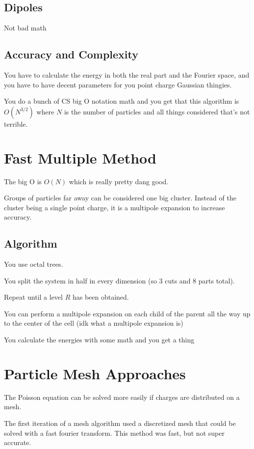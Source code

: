 \documentclass[fleqn]{report}
\begin{document}
\subsection{Dipoles}
Not bad math

\subsection{Accuracy and Complexity}
You have to calculate the energy in both the real part and the Fourier space, and 
you have to have decent parameters for you point charge Gaussian thingies. 

You do a bunch of CS big O notation math and you get that this algorithm 
is $O(N^{3/2})$ where $N$ is the number of particles and all things considered 
that's not terrible.

\section{Fast Multiple Method}
The big O is $O(N)$ which is really pretty dang good. 

Groups of particles far away can be considered one big cluster.
Instead of the cluster being a single point charge, it is a multipole expansion 
to increase accuracy.

\subsection{Algorithm}
You use octal trees. 

You split the system in half in every dimension (so 3 cuts and 8 parts total).

Repeat until a level $R$ has been obtained. 

You can perform a multipole expansion on each child of the parent all the way 
up to the center of the cell (idk what a multipole expansion is)

You calculate the energies with some math and you get a thing 

\section{Particle Mesh Approaches}
The Poisson equation can be solved more easily if charges are distributed on 
a mesh. 

The first iteration of a mesh algorithm used a discretized mesh that could 
be solved with a fast fourier transform. This method was fast, but not 
super accurate. 
\end{document}
